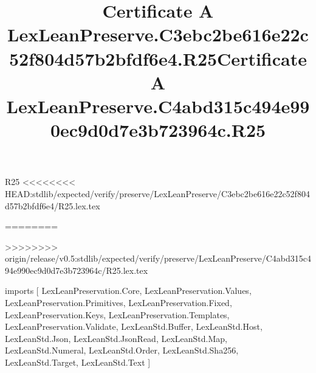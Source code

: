 \begin{lexlean}{R25}
<<<<<<<< HEAD:stdlib/expected/verify/preserve/LexLeanPreserve/C3ebc2be616e22c52f804d57b2bfdf6e4/R25.lex.tex
\title{Certificate A LexLeanPreserve.C3ebc2be616e22c52f804d57b2bfdf6e4.R25}
========
\title{Certificate A LexLeanPreserve.C4abd315c494e990ec9d0d7e3b723964c.R25}
>>>>>>>> origin/release/v0.5:stdlib/expected/verify/preserve/LexLeanPreserve/C4abd315c494e990ec9d0d7e3b723964c/R25.lex.tex
\begin{coremodule}
imports [
  LexLeanPreservation.Core,
  LexLeanPreservation.Values,
  LexLeanPreservation.Primitives,
  LexLeanPreservation.Fixed,
  LexLeanPreservation.Keys,
  LexLeanPreservation.Templates,
  LexLeanPreservation.Validate,
  LexLeanStd.Buffer,
  LexLeanStd.Host,
  LexLeanStd.Json,
  LexLeanStd.JsonRead,
  LexLeanStd.Map,
  LexLeanStd.Numeral,
  LexLeanStd.Order,
  LexLeanStd.Sha256,
  LexLeanStd.Target,
  LexLeanStd.Text
]


\end{coremodule}
\end{lexlean}
